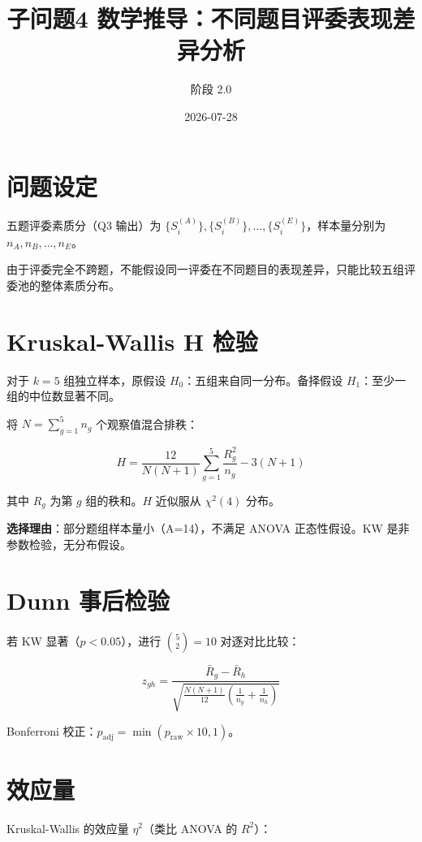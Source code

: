 \documentclass[UTF8]{ctexart}
\title{子问题4 数学推导：不同题目评委表现差异分析}
\author{阶段 2.0}
\date{2026-07-28}
\begin{document}
\maketitle

\section{问题设定}

五题评委素质分（Q3 输出）为 $\{S_i^{(A)}\}, \{S_i^{(B)}\}, \ldots, \{S_i^{(E)}\}$，样本量分别为 $n_A, n_B, \ldots, n_E$。

由于评委完全不跨题，不能假设同一评委在不同题目的表现差异，只能比较五组评委池的整体素质分布。

\section{Kruskal-Wallis H 检验}

对于 $k=5$ 组独立样本，原假设 $H_0$：五组来自同一分布。备择假设 $H_1$：至少一组的中位数显著不同。

将 $N = \sum_{g=1}^{5} n_g$ 个观察值混合排秩：

\begin{equation}
H = \frac{12}{N(N+1)}\sum_{g=1}^{5}\frac{R_g^2}{n_g} - 3(N+1)
\end{equation}

其中 $R_g$ 为第 $g$ 组的秩和。$H$ 近似服从 $\chi^2(4)$ 分布。

\textbf{选择理由}：部分题组样本量小（A=14），不满足 ANOVA 正态性假设。KW 是非参数检验，无分布假设。

\section{Dunn 事后检验}

若 KW 显著（$p < 0.05$），进行 $\binom{5}{2}=10$ 对逐对比比较：

\begin{equation}
z_{gh} = \frac{\bar{R}_g - \bar{R}_h}{\sqrt{\frac{N(N+1)}{12}\left(\frac{1}{n_g} + \frac{1}{n_h}\right)}}
\end{equation}

Bonferroni 校正：$p_{\text{adj}} = \min(p_{\text{raw}} \times 10, 1)$。

\section{效应量}

Kruskal-Wallis 的效应量 $\eta^2$（类比 ANOVA 的 $R^2$）：
\end{document}
